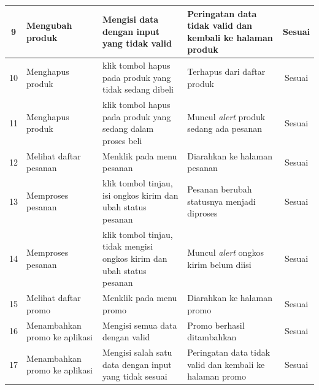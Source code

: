 \begin{longtable}{| m{0.5cm} | m{3.2cm} | m{3.4cm} | m{3.3cm} | m{1.6cm} |}
	\hline
	\multicolumn{1}{|c|}{{\footnotesize 9}} & {\footnotesize Mengubah produk} & {\footnotesize Mengisi data dengan input yang tidak valid} & {\footnotesize Peringatan data tidak valid dan kembali ke halaman produk} & \multicolumn{1}{|c|}{{\footnotesize Sesuai}}\\
	\hline
	\multicolumn{1}{|c|}{{\footnotesize 10}} & {\footnotesize Menghapus produk} & {\footnotesize klik tombol hapus pada produk yang tidak sedang dibeli} & {\footnotesize Terhapus dari daftar produk} & \multicolumn{1}{|c|}{{\footnotesize Sesuai}}\\
	\hline
	\multicolumn{1}{|c|}{{\footnotesize 11}} & {\footnotesize Menghapus produk} & {\footnotesize klik tombol hapus pada produk yang sedang dalam proses beli} & {\footnotesize Muncul \textit{alert} produk sedang ada pesanan} & \multicolumn{1}{|c|}{{\footnotesize Sesuai}}\\
	\hline
	\multicolumn{1}{|c|}{{\footnotesize 12}} & {\footnotesize Melihat daftar pesanan} & {\footnotesize Menklik pada menu pesanan} & {\footnotesize Diarahkan ke halaman pesanan} & \multicolumn{1}{|c|}{{\footnotesize Sesuai}}\\
	\hline
	\multicolumn{1}{|c|}{{\footnotesize 13}} & {\footnotesize Memproses pesanan} & {\footnotesize klik tombol tinjau, isi ongkos kirim dan ubah status pesanan} & {\footnotesize Pesanan berubah statusnya menjadi diproses} & \multicolumn{1}{|c|}{{\footnotesize Sesuai}}\\
	\hline
	\multicolumn{1}{|c|}{{\footnotesize 14}} & {\footnotesize Memproses pesanan} & {\footnotesize klik tombol tinjau, tidak mengisi ongkos kirim dan ubah status pesanan} & {\footnotesize Muncul \textit{alert} ongkos kirim belum diisi} & \multicolumn{1}{|c|}{{\footnotesize Sesuai}}\\
	\hline
	\multicolumn{1}{|c|}{{\footnotesize 15}} & {\footnotesize Melihat daftar promo} & {\footnotesize Menklik pada menu promo} & {\footnotesize Diarahkan ke halaman promo} & \multicolumn{1}{|c|}{{\footnotesize Sesuai}}\\
	\hline
	\multicolumn{1}{|c|}{{\footnotesize 16}} & {\footnotesize Menambahkan promo ke aplikasi} & {\footnotesize Mengisi semua data dengan valid} & {\footnotesize Promo berhasil ditambahkan} & \multicolumn{1}{|c|}{{\footnotesize Sesuai}}\\
	\hline
	\multicolumn{1}{|c|}{{\footnotesize 17}} & {\footnotesize Menambahkan promo ke aplikasi} & {\footnotesize Mengisi salah satu data dengan input yang tidak sesuai} & {\footnotesize Peringatan data tidak valid dan kembali ke halaman promo} & \multicolumn{1}{|c|}{{\footnotesize Sesuai}}\\

\end{longtable}
